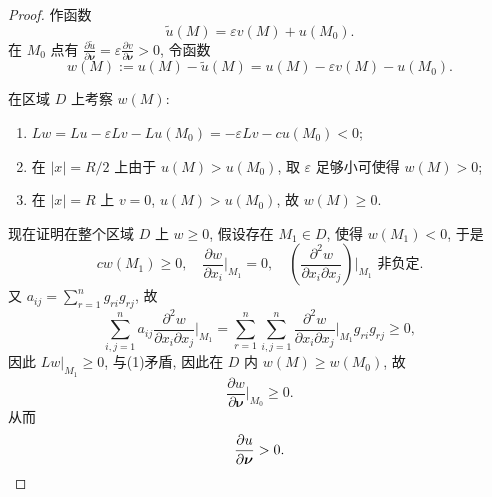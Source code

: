 \begin{proof}
  作函数
  \[\tilde{u}(M)=\varepsilon v(M)+u(M_0).\]
  在 $M_0$ 点有 $\frac{\partial\tilde{u}}{\partial\bm{\nu}}
  = \varepsilon\frac{\partial v}{\partial\bm{\nu}}>0$,
  令函数
  \[w(M) := u(M)-\tilde{u}(M) = u(M)-\varepsilon v(M)-u(M_0).\]
  
  在区域 $D$ 上考察 $w(M)$:
  \begin{enumerate}[(1)]
    \item $Lw=Lu-\varepsilon Lv-Lu(M_0)=-\varepsilon Lv-cu(M_0)<0$;
    \item 在 $|x| = R/2$ 上由于 $u(M)>u(M_0)$,
      取 $\varepsilon$ 足够小可使得 $w(M)>0$;
    \item 在 $|x| = R$ 上 $v=0$, $u(M)>u(M_0)$, 故 $w(M)\geq 0$.
  \end{enumerate}
  现在证明在整个区域 $D$ 上 $w\geq 0$, 假设存在 $M_1\in D$, 使得 $w(M_1) < 0$, 于是
  \[cw(M_1)\geq 0,\quad \frac{\partial w}{\partial x_i}\bigg|_{M_1} = 0,
    \quad\left(\frac{\partial^2w}{\partial x_i\partial x_j}\right)\bigg|_{M_1}\text{ 非负定}.\]
  又 $a_{ij}=\sum_{r=1}^n g_{ri}g_{rj}$, 故
  \[\sum_{i,j=1}^na_{ij}\frac{\partial^2w}{\partial x_i\partial x_j}
    \bigg|_{M_1}=\sum_{r=1}^n\sum_{i,j=1}^n\frac{\partial^2w}{\partial x_i\partial x_j}
    \bigg|_{M_1}g_{ri}g_{rj}\geq 0,\]
  因此 $Lw|_{M_1}\geq 0$, 与(1)矛盾, 因此在 $D$ 内 $w(M)\geq w(M_0)$, 故
  \[\frac{\partial w}{\partial\bm{\nu}}\bigg|_{M_0} \geq 0.\]
  从而
  \[\frac{\partial u}{\partial\bm{\nu}} > 0. \qedhere\]
\end{proof}